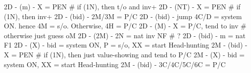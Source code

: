 2D - (m) - X = PEN  # if (1N), then t/o and inv+
2D - (NT) - X = PEN  # if (1N), then inv+
2D - (bid) - 2M/3M = P/C
2D - (bid) - jump 4C/D = system ON. hence 4M = s/o. Otherwise, 4H = P/C
2D - (M) - X = P/C, tend to inv  # otherwise just guess oM
2D - (2M) - 2N = nat inv NF # ?
2D - (bid) - m = nat F1
2D - (X) - bid = system ON, P = s/o, XX = start Head-hunting
2M - (bid) - X = PEN  # if (1N), then just value-showing and tend to P/C
2M - (X) - bid = system ON, XX = start Head-hunting
2M - (bid) - 3C/4C/5C/6C = P/C